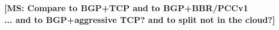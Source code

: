 \documentclass[sigconf,usenames,dvipsnames,geometry]{acmart}
\newcommand{\mycomm}[3]{{\color{#2} \textbf{[#1: #3]}}}
\newcommand{\mycomm}[3]{}
\newcommand{\MS}[1]{\mycomm{MS}{red}{#1}}
\begin{document}
\MS{Compare to BGP+TCP and to BGP+BBR/PCCv1 \\
... and to BGP+aggressive TCP? and to split not in the cloud?}

\end{document}
